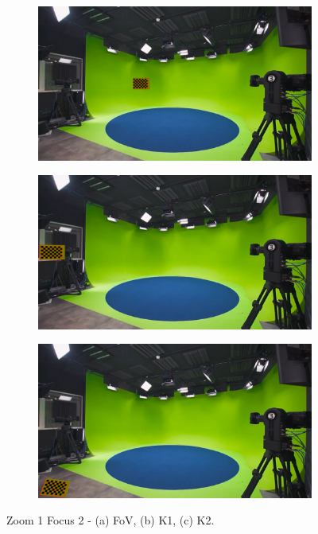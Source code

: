 \begin{figure}[h]
    \centering
    \begin{subfigure}[b]{0.45\textwidth}
        \includegraphics[width=\textwidth]{Images/08annex/results/2.2.png}
        \caption{}
        \label{fig:a2}
    \end{subfigure}
    \hfill
    \begin{subfigure}[b]{0.45\textwidth}
        \includegraphics[width=\textwidth]{Images/08annex/results/2.3.png}
        \caption{}
        \label{fig:b2}
    \end{subfigure}
    
    \vspace{0.5cm}
    
    \begin{subfigure}[b]{0.45\textwidth}
        \includegraphics[width=\textwidth]{Images/08annex/results/2.4.png}
        \caption{}
        \label{fig:c2}
    \end{subfigure}

    \caption{Zoom 1 Focus 2 - (a) FoV, (b) K1, (c) K2.}
    \label{fig:vir_fov_cal}
\end{figure}

